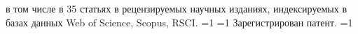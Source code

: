          в том числе в 35 статьях в рецензируемых научных изданиях, индексируемых в базах данных Web of Science, Scopus, RSCI. %
        \ifnum \value{citeregistered}=1%
           \ifnum \value{citeauthorpatent}=1%
               Зарегистрирован  патент.
           \fi%
           \ifnum \value{citeauthorprogram}=1%
